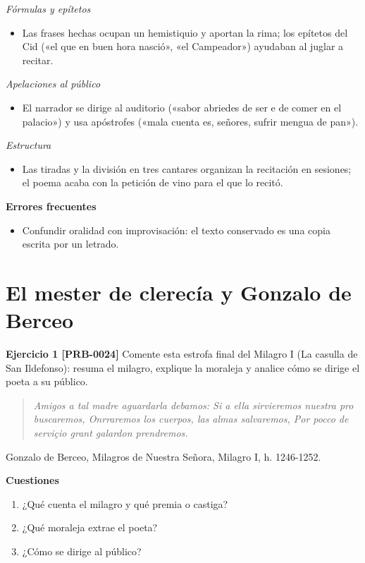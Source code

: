 \documentclass{book}
\begin{document}
\noindent\textit{Fórmulas y epítetos}
\begin{itemize}
\item Las frases hechas ocupan un hemistiquio y aportan la rima; los epítetos del Cid («el que en buen hora nasció», «el Campeador») ayudaban al juglar a recitar.
\end{itemize}

\noindent\textit{Apelaciones al público}
\begin{itemize}
\item El narrador se dirige al auditorio («sabor abriedes de ser e de comer en el palacio») y usa apóstrofes («mala cuenta es, señores, sufrir mengua de pan»).
\end{itemize}

\noindent\textit{Estructura}
\begin{itemize}
\item Las tiradas y la división en tres cantares organizan la recitación en sesiones; el poema acaba con la petición de vino para el que lo recitó.
\end{itemize}

\noindent\textbf{Errores frecuentes}
\begin{itemize}
\item Confundir oralidad con improvisación: el texto conservado es una copia escrita por un letrado.
\end{itemize}

\section{El mester de clerecía y Gonzalo de Berceo}

\noindent\textbf{Ejercicio 1 [PRB-0024]}
Comente esta estrofa final del Milagro I (La casulla de San Ildefonso): resuma el milagro, explique la moraleja y analice cómo se dirige el poeta a su público.


\begin{quote}
\itshape Amigos a tal madre aguardarla debamos: Si a ella sirvieremos nuestra pro buscaremos, Onrraremos los cuerpos, las almas salvaremos, Por pocco de serviçio grant galardon prendremos.
\end{quote}
{\noindent\footnotesize Gonzalo de Berceo, Milagros de Nuestra Señora, Milagro I, h. 1246-1252.\par}

\noindent\textbf{Cuestiones}
\begin{enumerate}
\item ¿Qué cuenta el milagro y qué premia o castiga?
\item ¿Qué moraleja extrae el poeta?
\item ¿Cómo se dirige al público?
\end{enumerate}
\end{document}
